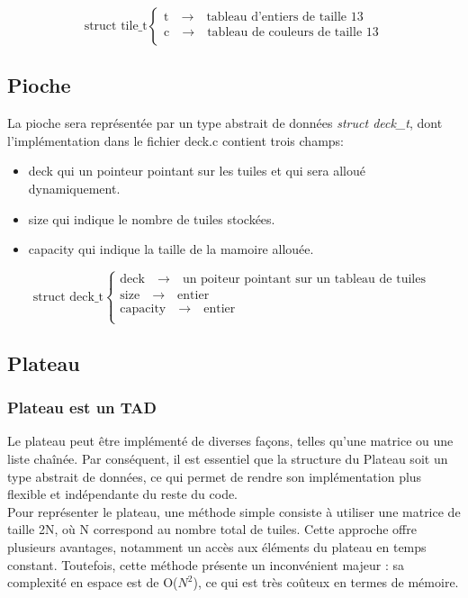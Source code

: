 \documentclass[10pt]{article}
\begin{document}
\[
\text{struct tile\_t} \left\{
\begin{array}{l}
\text{t} \quad \rightarrow \quad \text{tableau d'entiers de taille 13}\\
\text{c} \quad \rightarrow \quad \text{tableau de couleurs de taille 13}\\
\end{array}
\right.
\]

\subsection{Pioche}
La pioche sera représentée par un type abstrait de données \textit{struct deck\_t}, dont l'implémentation dans le fichier deck.c contient trois champs:
\begin{itemize}
    \item deck qui un pointeur pointant sur les tuiles et qui sera alloué dynamiquement.
    \item size qui indique le nombre de tuiles stockées.
    \item capacity qui indique la taille de la mamoire allouée.
\end{itemize}
\[
\text{struct deck\_t} \left\{
\begin{array}{l}
\text{deck} \quad \rightarrow \quad \text{un poiteur pointant sur un tableau de tuiles }\\
\text{size} \quad \rightarrow \quad \text{entier}\\
\text{capacity} \quad \rightarrow \quad \text{entier}\\
\end{array}
\right.
\]
\subsection{Plateau}
\subsubsection{Plateau est un TAD }
Le plateau peut être implémenté de diverses façons, telles qu'une matrice ou une liste chaînée. Par conséquent, il est essentiel que la structure du Plateau soit un type abstrait de données, ce qui permet de rendre son implémentation plus flexible et indépendante du reste du code. \\
Pour représenter le plateau, une méthode simple consiste à utiliser une matrice de taille 2N, où N correspond au nombre total de tuiles. Cette approche offre plusieurs avantages, notamment un accès aux éléments du plateau en temps constant. Toutefois, cette méthode présente un inconvénient majeur : sa complexité en espace est de O($N^2$), ce qui est très coûteux en termes de mémoire.
\end{document}
